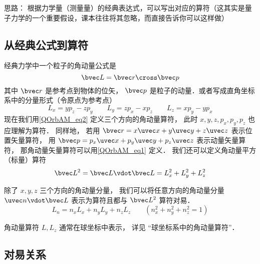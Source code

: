 
\begin{issues}
\issueDraft
\end{issues}


思路： 根据力学量（测量量）的经典表达式，可以写出对应的算符（这其实是量子力学的一个重要假设，课本往往将其忽略，而直接告诉你可以这样做）

\subsection{从经典公式到算符}

经典力学中一个粒子的角动量公式是
\begin{equation}\label{QOrbAM_eq1}
\bvec L = \bvec r \cross \bvec p
\end{equation}
其中 $\bvec r$ 是参考点到物体的位矢， $\bvec p$ 是粒子的动量．或者写成直角坐标系中的分量形式（令原点为参考点）
\begin{equation}\label{QOrbAM_eq2}
L_x = y p_z - z p_y \qquad
L_y = z p_x - x p_z \qquad
L_z = x p_y - y p_x
\end{equation}   
现在我们用\autoref{QOrbAM_eq2} 定义三个方向的角动量算符， 此时 $x, y, z, p_x, p_y, p_z$ 也应理解为算符． 同样地， 若用 $\bvec r = x\uvec x + y\uvec y + z\uvec z$ 表示位置矢量算符， 用 $\bvec p = p_x \uvec x + p_y\uvec y + p_z\uvec z$ 表示动量矢量算符， 那角动量矢量算符可以用\autoref{QOrbAM_eq1} 定义． 我们还可以定义角动量平方（标量）算符
\begin{equation}
\bvec L^2 = \bvec L \vdot \bvec L = L_x^2 + L_y^2 + L_z^2
\end{equation}

除了 $x, y, z$ 三个方向的角动量分量， 我们可以将任意方向的角动量分量 $\uvec n \vdot \bvec L$ 表示为算符且都与 $\bvec L^2$ 算符对易．
\begin{equation}
L_n = n_x L_x + n_y L_y + n_z L_z \qquad (n_x^2 + n_y^2 + n_z^2 = 1)
\end{equation}

角动量算符 $L, L_z$ 通常在球坐标中表示， 详见 “球坐标系中的角动量算符”．

\subsection{对易关系}

